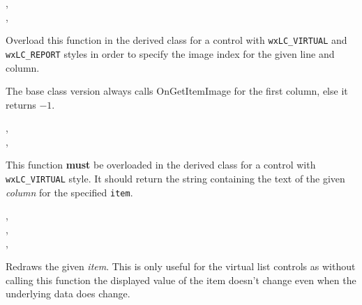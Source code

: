 ,\\
,\\

\label{wxlistctrlongetitemcolumnimage}


Overload this function in the derived class for a control with
{\tt wxLC\_VIRTUAL} and {\tt wxLC\_REPORT} styles in order to specify the image
index for the given line and column.

The base class version always calls OnGetItemImage for the first column, else
it returns $-1$.


,\\
,\\

\label{wxlistctrlongetitemtext}


This function {\bf must} be overloaded in the derived class for a control with
{\tt wxLC\_VIRTUAL} style. It should return the string containing the text of
the given {\it column} for the specified {\tt item}.


,\\
,\\
,\\


\label{wxlistctrlrefreshitem}


Redraws the given {\it item}. This is only useful for the virtual list controls
as without calling this function the displayed value of the item doesn't change
even when the underlying data does change.

